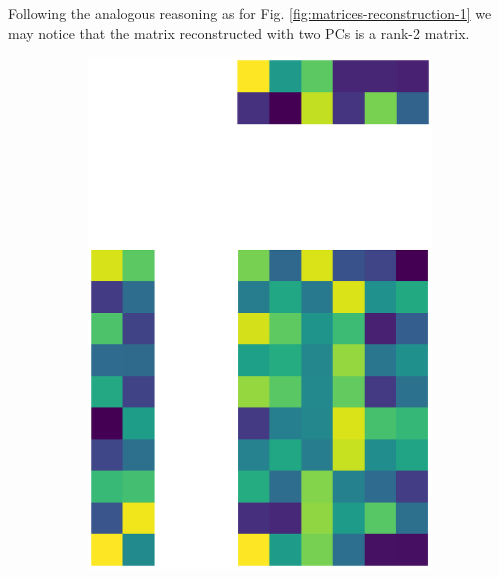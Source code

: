\documentclass[10pt,twocolumn]{article}
\begin{document}
Following the analogous reasoning as for Fig. \ref{fig:matrices-reconstruction-1} we may notice that the matrix reconstructed with two PCs is a rank-2 matrix.


\begin{figure}[H]
\begin{subfigure}[t]{.15\textwidth}
\centering
\includegraphics[scale=.2]{DWGs/random-matrix-reconstruction-PCs-2.eps}
\caption{ }
\end{subfigure}
\begin{subfigure}[t]{.15\textwidth}
\centering

\end{subfigure}
\end{figure}
\end{document}
